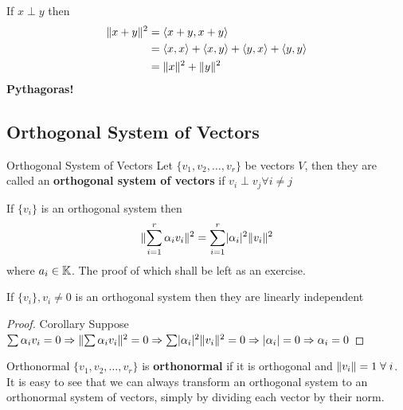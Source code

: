 \begin{observe}
    If \(x \perp y\) then \begin{align*}
        \lVert x+y\rVert^2 & =  \langle x+y, x+y \rangle                                                              \\
                     & = \langle x, x \rangle + \langle x, y \rangle + \langle y, x \rangle + \langle y, y \rangle \\
                     & = \lVert x\rVert^2 + \lVert y\rVert^2
    \end{align*}
    \textbf{Pythagoras!}
\end{observe}

\subsection{Orthogonal System of Vectors}
\begin{definition} {Orthogonal System of Vectors}
    Let \(\{v_1, v_2, \dots, v_r\}\) be vectors \(V\), then they are called an \textbf{orthogonal system of vectors} if \(v_i \perp v_j \forall i \neq j\)
\end{definition}

\begin{lemma}
    If \(\{v_i\}\) is an orthogonal system then \[
        \lVert\sum_{i=1}^{r} \alpha_i v_i\rVert^2 = \sum_{i=1}^{r} \lvert\alpha_i\rvert^2 \lVert v_i\rVert^2
    \]
    where \(a_i \in \mathbb{K}\). The proof of which shall be left as an exercise.
\end{lemma}

\begin{corollary}
    If \(\{v_i\}, v_i \neq 0\) is an orthogonal system then they are linearly independent
\end{corollary}

\begin{proof} {Corollary}
    Suppose \(\sum \alpha_i v_i = 0 \Rightarrow \lVert\sum \alpha_i v_i\rVert^2 = 0 \Rightarrow \sum \lvert\alpha_i\rvert^2 \lVert v_i\rVert^2 = 0 \Rightarrow \lvert\alpha_i\rvert = 0 \Rightarrow \alpha_i = 0\)
\end{proof}

\begin{definition} {Orthonormal}
    \(\{v_1, v_2, \dots, v_r\}\) is \textbf{orthonormal} if it is orthogonal and \(\norm{v_i} = 1 \forall i\). It is easy to see that we can always transform an orthogonal system to an orthonormal system of vectors, simply by dividing each vector by their norm.
\end{definition}

